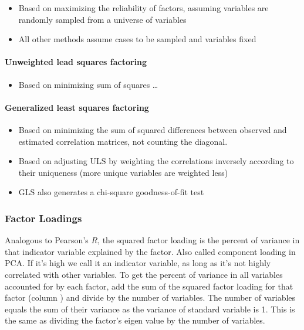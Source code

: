 \documentclass[]{book}
\providecommand{\tightlist}{%
  \setlength{\itemsep}{0pt}\setlength{\parskip}{0pt}}
\let\oldparagraph\paragraph
\renewcommand{\paragraph}[1]{\oldparagraph{#1}\mbox{}}
\theoremstyle{definition}
\theoremstyle{definition}
\theoremstyle{definition}
\theoremstyle{remark}
\begin{document}
\begin{itemize}
\tightlist
\item
  Based on maximizing the reliability of factors, assuming variables are
  randomly sampled from a universe of variables
\item
  All other methods assume cases to be sampled and variables fixed
\end{itemize}

\paragraph{Unweighted lead squares
factoring}\label{unweighted-lead-squares-factoring}

\begin{itemize}
\tightlist
\item
  Based on minimizing sum of squares \ldots{}
\end{itemize}

\paragraph{Generalized least squares
factoring}\label{generalized-least-squares-factoring}

\begin{itemize}
\tightlist
\item
  Based on minimizing the sum of squared differences between observed
  and estimated correlation matrices, not counting the diagonal.
\item
  Based on adjusting ULS by weighting the correlations inversely
  according to their uniqueness (more unique variables are weighted
  less)
\item
  GLS also generates a chi-square goodness-of-fit test
\end{itemize}

\subsubsection{Factor Loadings}\label{factor-loadings}

Analogous to Pearson's \(R\), the squared factor loading is the percent
of variance in that indicator variable explained by the factor. Also
called component loading in PCA. If it's high we call it an indicator
variable, as long as it's not highly correlated with other variables. To
get the percent of variance in all variables accounted for by each
factor, add the sum of the squared factor loading for that factor
(column ) and divide by the number of variables. The number of variables
equals the sum of their variance as the variance of standard variable is
1. This is the same as dividing the factor's eigen value by the number
of variables.
\end{document}

